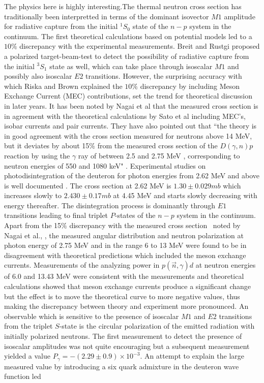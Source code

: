 The physics here is highly interesting.The thermal neutron cross section \cite{chap34-key22} has traditionally been interpretted in terms of the dominant isovector $M1$ amplitude for radiative capture from the initial $^1S_0$ state of the $n-p$ system in the continuum. The first theoretical calculations \cite{chap34-key23} based on potential models led to a $10\%$ discrepancy with the experimental measurements. Breit and Rustgi \cite{chap34-key24} proposed a polarized target-beam-test to detect the possibility of radiative capture from the initial $^3S_1$ state as well, which can take place through isoscalar $M1$ and possibly also isoscalar $E2$ transitions. However, the surprising accuracy with which Riska and Brown \cite{chap34-key25} explained the $10\%$ discrepancy by including Meson Exchange Current (MEC) contributions, set the trend for theoretical discussion in later years. It has been noted by Nagai et al \cite{chap34-key21} that the measured cross section is in agreement with the theoretical calculations by Sato et al \cite{chap34-key26} including MEC's, isobar currents and pair currents. They have also pointed out that ``the theory is in good agreement with the cross section measured for neutrons above 14 MeV, but it deviates by about 15$\%$ from the measured cross section of the $D(\gamma,n)p$ reaction by using the $\gamma$ ray of between 2.5 and 2.75 MeV \cite{chap34-key27}, corresponding to neutron energies of 550 and 1080 keV" \cite{chap34-key21}. Experimental studies on photodisintegration of the deuteron for photon energies from 2.62 MeV and above is well documented  \cite{chap34-key28}. The cross section at 2.62 MeV is $1.30\pm 0.029 mb$ which increases slowly to $2.430 \pm 0.17 mb$ at 4.45 MeV and starts slowly decreasing with energy thereafter. The disintegration process is dominantly through $E1$ transitions leading to final triplet $P$-states of the $n-p$ system in the continuum. Apart from the 15$\%$ discrepancy with the measured cross section~\cite{chap34-key27} noted by Nagai et al., \cite{chap34-key21}, the measured angular distribution and neutron polarization at photon energy of 2.75 MeV \cite{chap34-key29} and in the range 6 to 13 MeV \cite{chap34-key30} were found to be in disagreement with theoretical predictions which included the meson exchange currents. Measurements of the analyzing power \cite{chap34-key31} in $p(\vec n, \gamma)d$ at neutron energies of 6.0 and 13.43 MeV were consistent with the measurements \cite{chap34-key30} and theoretical calculations \cite{chap34-key32} showed that meson exchange currents produce a significant change but the effect is to move the theoretical curve to more negative values, thus making the discrepancy between theory and experiment more pronounced. An observable which is sensitive to the presence of isoscalar $M1$ and $E2$ transitions from the triplet $S$-state is the circular polarization of the emitted radiation with initially polarized neutrons. The first measurement \cite{chap34-key33} to detect the presence of isoscalar amplitudes was not quite encouraging but a subsequent measurement \cite{chap34-key34} yielded a value $P_\gamma= -(2.29 \pm 0.9)\times 10^{-3}$. An attempt \cite{chap34-key35} to explain the large measured value by introducing a six quark admixture in the deuteron wave function led 